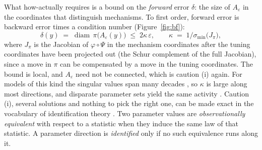 \documentclass[11pt]{article}
\begin{document}
What how-actually requires is a bound on the \emph{forward} error $\delta$: the size of $A_\varepsilon$ in the coordinates that distinguish mechanisms. To first order, forward error is backward error times a condition number \parencite{higham2002,corless2016} (Figure~\ref{fig:bf}):
\begin{equation}
\delta(y)\;=\;\operatorname{diam}\,\pi\bigl(A_{\varepsilon}(y)\bigr)\;\le\;2\kappa\,\varepsilon,
\qquad
\kappa \;=\; 1\big/\sigma_{\min}\!\bigl(J_{\pi}\bigr),
\label{eq:forward}
\end{equation}
where $J_\pi$ is the Jacobian of $\varphi\circ\Psi$ in the mechanism coordinates after the tuning coordinates have been projected out (the Schur complement of the full Jacobian), since a move in $\pi$ can be compensated by a move in the tuning coordinates. The bound is local, and $A_\varepsilon$ need not be connected, which is caution (i) again. For models of this kind the singular values span many decades \parencite{gutenkunst2007,machta2013,transtrum2015}, so $\kappa$ is large along most directions, and disparate parameter sets yield the same activity \parencite{prinz2004}. Caution (i), several solutions and nothing to pick the right one, can be made exact in the vocabulary of identification theory \parencite{rothenberg1971}. Two parameter values are \emph{observationally equivalent} with respect to a statistic when they induce the same law of that statistic. A parameter direction is \emph{identified} only if no such equivalence runs along it.
\end{document}
